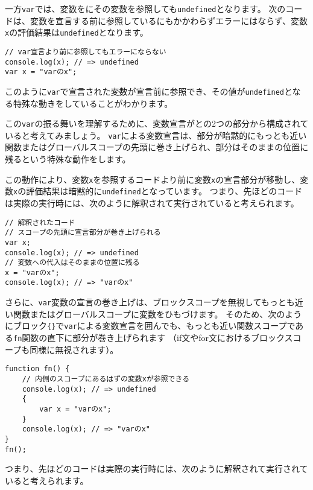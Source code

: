 一方\texttt{var}では、変数を\textbf{}にその変数を参照しても\texttt{undefined}となります。
次のコードは、変数を宣言する前に参照しているにもかかわらずエラーにはならず、変数\texttt{x}の評価結果は\texttt{undefined}となります。

\begin{lstlisting}
// var宣言より前に参照してもエラーにならない
console.log(x); // => undefined
var x = "varのx";
\end{lstlisting}

このように\texttt{var}で宣言された変数が宣言前に参照でき、その値が\texttt{undefined}となる特殊な動きをしていることがわかります。

この\texttt{var}の振る舞いを理解するために、変数宣言が\textbf{}と\textbf{}の2つの部分から構成されていると考えてみましょう。
\texttt{var}による変数宣言は、\textbf{}部分が暗黙的にもっとも近い関数またはグローバルスコープの先頭に巻き上げられ、\textbf{}部分はそのままの位置に残るという特殊な動作をします。

この動作により、変数\texttt{x}を参照するコードより前に変数\texttt{x}の宣言部分が移動し、変数\texttt{x}の評価結果は暗黙的に\texttt{undefined}となっています。
つまり、先ほどのコードは実際の実行時には、次のように解釈されて実行されていると考えられます。

\begin{lstlisting}
// 解釈されたコード
// スコープの先頭に宣言部分が巻き上げられる
var x;
console.log(x); // => undefined
// 変数への代入はそのままの位置に残る
x = "varのx";
console.log(x); // => "varのx"
\end{lstlisting}

さらに、\texttt{var}変数の宣言の巻き上げは、ブロックスコープを無視してもっとも近い関数またはグローバルスコープに変数をひもづけます。
そのため、次のようにブロック\texttt{\{\}}で\texttt{var}による変数宣言を囲んでも、もっとも近い関数スコープである\texttt{fn}関数の直下に\textbf{}部分が巻き上げられます
（if文やfor文におけるブロックスコープも同様に無視されます）。

\begin{lstlisting}
function fn() {
    // 内側のスコープにあるはずの変数xが参照できる
    console.log(x); // => undefined
    {
        var x = "varのx";
    }
    console.log(x); // => "varのx"
}
fn();
\end{lstlisting}

つまり、先ほどのコードは実際の実行時には、次のように解釈されて実行されていると考えられます。

